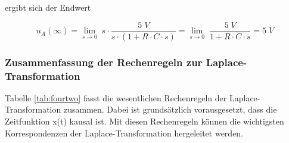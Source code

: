 \noindent ergibt sich der Endwert

\begin{equation}\label{eq:fourhundredfive}
u_{A} \left(\infty \right)=\lim\limits_{s\to 0}\; s\cdot \frac{5\; V}{s\cdot \left(1+R\cdot C\cdot s\right)} =\lim\limits_{s\to 0} \; \frac{5\; V}{1+R\cdot C\cdot s} =5\; V
\end{equation}

\subsubsection{Zusammenfassung der Rechenregeln zur Laplace-Transformation}

Tabelle \ref{tab:fourtwo} fasst die wesentlichen Rechenregeln der Laplace-Transformation zusammen. Dabei ist grundsätzlich vorausgesetzt, dass die Zeitfunktion x(t) kausal ist. Mit diesen Rechenregeln können die wichtigsten Korrespondenzen der Laplace-Transformation hergeleitet werden.

\clearpage 

